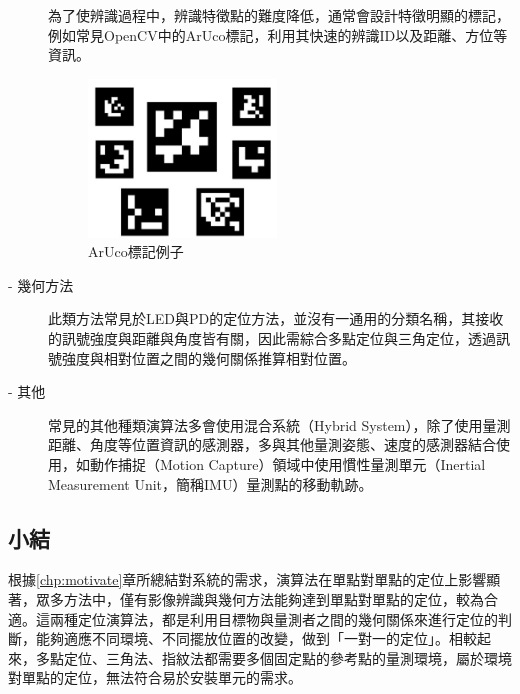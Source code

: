 \begin{description}
        \qquad
        為了使辨識過程中，辨識特徵點的難度降低，通常會設計特徵明顯的標記，例如常見OpenCV中的ArUco標記，利用其快速的辨識ID以及距離、方位等資訊。
        
        \begin{figure}[htpb]
            \centering
            \includegraphics[width=5cm]{ch2pic/aruco.png}
            \caption{ArUco標記例子\cite{pic:aruco}}
            \label{pic:aruco}
        \end{figure}
        
        \item[- 幾何方法] \hfill 
        
        \qquad
        此類方法常見於LED與PD的定位方法，並沒有一通用的分類名稱，其接收的訊號強度與距離與角度皆有關，因此需綜合多點定位與三角定位，透過訊號強度與相對位置之間的幾何關係推算相對位置\cite{survey_light2020}。
        
        \item[- 其他]\hfill 
        
        \qquad
        常見的其他種類演算法多會使用混合系統（Hybrid System）\cite{survey_indoor2018}，除了使用量測距離、角度等位置資訊的感測器，多與其他量測姿態、速度的感測器結合使用，如動作捕捉（Motion Capture）領域中使用慣性量測單元（Inertial Measurement Unit，簡稱IMU）量測點的移動軌跡。

    \end{description}

    \subsection{小結}

    根據\ref{chp:motivate}章所總結對系統的需求，演算法在單點對單點的定位上影響顯著，眾多方法中，僅有影像辨識與幾何方法能夠達到單點對單點的定位，較為合適。這兩種定位演算法，都是利用目標物與量測者之間的幾何關係來進行定位的判斷，能夠適應不同環境、不同擺放位置的改變，做到「一對一的定位」。相較起來，多點定位、三角法、指紋法都需要多個固定點的參考點的量測環境，屬於環境對單點的定位，無法符合易於安裝單元的需求。





